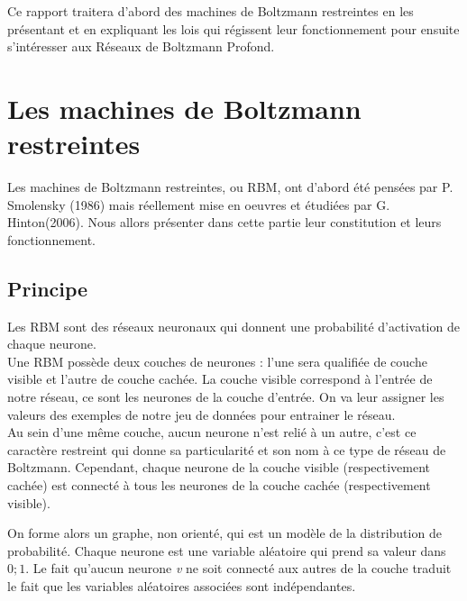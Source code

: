 \documentclass[a4paper,twoside]{report}
\begin{document}
            Ce rapport traitera d'abord des machines de Boltzmann restreintes en les
            présentant et en expliquant les lois qui régissent leur fonctionnement pour
            ensuite s'intéresser aux Réseaux de Boltzmann Profond.

        \chapter{Les machines de Boltzmann restreintes}

            Les machines de Boltzmann restreintes, ou RBM, ont d'abord été
            pensées par P. Smolensky (1986) mais réellement mise en oeuvres et
            étudiées par G.
            Hinton(2006). Nous allors présenter dans cette partie leur constitution et
            leurs fonctionnement.

            \section{Principe}

                Les RBM sont des réseaux neuronaux qui donnent une
                probabilité d'activation de chaque neurone.\\

                Une RBM possède deux couches de neurones : l'une sera qualifiée 
                de couche visible et l'autre de couche cachée.
                La couche visible correspond à l'entrée de notre réseau, ce sont
                les neurones de la couche d'entrée. On va leur assigner les
                valeurs des exemples de notre jeu de données pour entrainer le
                réseau.\\

                Au sein d'une même couche, aucun neurone n'est relié à un
                autre, c'est ce caractère restreint qui donne sa particularité 
                et son nom à ce type de réseau de Boltzmann.
                Cependant, chaque neurone de la couche visible (respectivement
                cachée) est connecté à tous les neurones de la couche cachée 
                (respectivement visible). 
                
                On forme alors un graphe, non orienté, qui est un
                modèle de la distribution de probabilité. Chaque neurone est une variable aléatoire
                qui prend sa valeur dans \begin{math}{0;1}\end{math}. Le fait
                qu'aucun neurone \textit{v} ne soit connecté aux autres de la
                couche traduit le fait que les variables aléatoires associées
                sont indépendantes.
                
\end{document}
